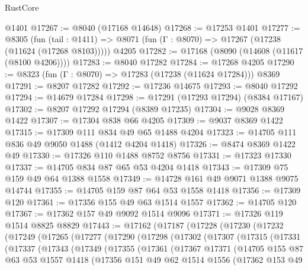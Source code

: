 \begin{lexlean}{RustCore}
\begin{coremodule}
    @1401
@17267 := @8040 (@17168 @14648)
@17268 := @17253 @1401
@17277 := @8305
    (fun (tail : @1411) => @8071 (fun (Γ : @8070) => @17267 (@17238 (@11624 (@17268 @8103)))))
    @4205
@17282 := @17168 (@8090 (@14608 (@11617 (@8100 @4206))))
@17283 := @8040 @17282
@17284 := @17268 @4205
@17290 := @8323 (fun (Γ : @8070) => @17283 (@17238 (@11624 @17284))) @8369
@17291 := @8207 @17282
@17292 := @17236 @14675
@17293 := @8040 @17292
@17294 := @14679 @17284
@17298 := @17291 (@17293 @17294) (@8384 @17167)
@17302 := @8207 @17292 @17294 (@8389 @17235)
@17304 := @9028 @8369 @1422
@17307 := @17304 @838 @66 @4205
@17309 := @9037 @8369 @1422
@17315 := @17309 @111 @834 @49 @65 @1488 @4204
@17323 := @14705 @111 @836 @49 @9050 @1488 (@1412 @4204 @1418)
@17326 := @8474 @8369 @1422 @49
@17330 := @17326 @110 @1488 @8752 @8756
@17331 := @17323 @17330
@17337 := @14705 @834 @87 @65 @53 @4204 @1418
@17343 := @17309 @75 @159 @49 @64 @1388 @1558
@17349 := @14728 @161 @49 @9071 @1388 @9075 @14744
@17355 := @14705 @159 @87 @64 @53 @1558 @1418
@17356 := @17309 @120
@17361 := @17356 @155 @49 @63 @1514 @1557
@17362 := @14705 @120
@17367 := @17362 @157 @49 @9092 @1514 @9096
@17371 := @17326 @119 @1514 @8825 @8829
@17443 := @17162
    (@17187
      (@17228
        (@17230
          (@17232
            (@17249
              (@17265
                (@17277
                  (@17290
                    (@17298
                      (@17302
                        (@17307
                          (@17315
                            (@17331
                              (@17337
                                (@17343
                                  (@17349
                                    (@17355
                                      (@17361
                                        (@17367
                                          @17371
                                          (@14705
                                            @155
                                            @87
                                            @63
                                            @53
                                            @1557
                                            @1418
                                            (@17356
                                              @151
                                              @49
                                              @62
                                              @1514
                                              @1556
                                              (@17362
                                                @153
                                                @49

\end{coremodule}
\end{lexlean}
